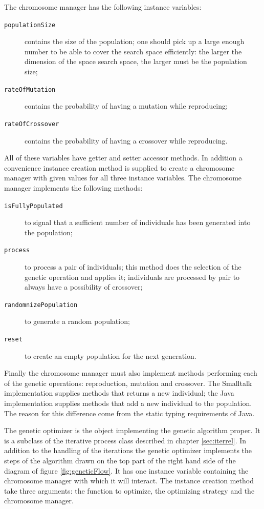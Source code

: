 \documentclass[twoside]{book}
\begin{document}
\noindent The chromosome manager has the following instance
variables:
\begin{description}
  \item[\tt populationSize] contains the size of the population;
  one should pick up a large enough number to be able to cover the
  search space efficiently: the larger the dimension of the space
  search space, the larger must be the population size;
  \item[\tt rateOfMutation] contains the probability of having a
  mutation while reproducing;
  \item[\tt rateOfCrossover] contains the probability of having a
  crossover while reproducing.
\end{description}
All of these variables have getter and setter accessor methods. In
addition a convenience instance creation method is supplied to
create a chromosome manager with given values for all three
instance variables. The chromosome manager implements the
following methods:
\begin{description}
  \item[\tt isFullyPopulated] to signal that a sufficient number of individuals
  has been generated into the population;
  \item[\tt process] to process a pair of individuals; this method
  does the selection of the genetic operation and applies it;
  individuals are processed by pair to always have a possibility
  of crossover;
  \item[\tt randomnizePopulation] to generate a random population;
  \item[\tt reset] to create an empty population for the next
  generation.
\end{description}
Finally the chromosome manager must also implement methods
performing each of the genetic operations: reproduction, mutation
and crossover. The Smalltalk implementation supplies methods that
returns a new individual; the Java implementation supplies methods
that add a new individual to the population. The reason for this
difference come from the static typing requirements of Java.

The genetic optimizer is the object implementing the genetic
algorithm proper. It is a subclass of the iterative process class
described in chapter \ref{sec:iterrel}. In addition to the
handling of the iterations the genetic optimizer implements the
steps of the algorithm drawn on the top part of the right hand
side of the diagram of figure \ref{fig:geneticFlow}. It has one
instance variable containing the chromosome manager with which it
will interact. The instance creation method take three arguments:
the function to optimize, the optimizing strategy and the
chromosome manager.
\end{document}
